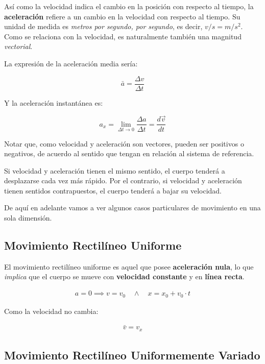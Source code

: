 Así como la velocidad indica el cambio en la posición con respecto al tiempo,
la \textbf{aceleración} refiere a un cambio en la velocidad con respecto al tiempo.
Su unidad de medida es \textit{metros por segundo, por segundo},
es decir, \(v/s = m/s^{2}\).
Como se relaciona con la velocidad,
es naturalmente también una magnitud \textit{vectorial}.

La expresión de la aceleración media sería:

\begin{equation*}
    \bar{a} = \frac{\Delta v}{\Delta t}
\end{equation*}

Y la aceleración instantánea es:

\begin{equation*}
    a_x = \lim_{\Delta t \to 0}\frac{\Delta a}{\Delta t} = \frac{d\vec{v}}{dt}
\end{equation*}

Notar que,
como velocidad y aceleración son vectores,
pueden ser positivos o negativos,
de acuerdo al sentido que tengan en relación al sistema de referencia.

Si velocidad y aceleración tienen el mismo sentido,
el cuerpo tenderá a desplazarse cada vez más rápido.
Por el contrario,
si velocidad y aceleración tienen sentidos contrapuestos,
el cuerpo tenderá a bajar su velocidad.

De aquí en adelante vamos a ver algunos casos particulares de movimiento 
en una sola dimensión.

\subsection{Movimiento Rectilíneo Uniforme}

El movimiento rectilíneo uniforme es aquel que posee \textbf{aceleración nula},
lo que \textit{implica} que el cuerpo se mueve con \textbf{velocidad constante} 
y en \textbf{línea recta}.

\begin{align*}
    a = 0 \implies v = v_0 \quad\land\quad x = x_0 + v_0 \cdot t
\end{align*}

Como la velocidad no cambia:

\begin{align*}
    \bar{v} = v_x
\end{align*}

\subsection{Movimiento Rectilíneo Uniformemente Variado}

